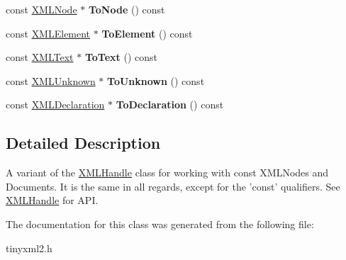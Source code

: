 \begin{DoxyCompactItemize}
\item 
\hypertarget{classtinyxml2_1_1_x_m_l_const_handle_a95d0256318c10c3f75fa5f8ffb3e4bc1}{const \hyperlink{classtinyxml2_1_1_x_m_l_node}{X\-M\-L\-Node} $\ast$ {\bfseries To\-Node} () const }\label{classtinyxml2_1_1_x_m_l_const_handle_a95d0256318c10c3f75fa5f8ffb3e4bc1}

\item 
\hypertarget{classtinyxml2_1_1_x_m_l_const_handle_a5a48adefc2a5e70d4ce5b55692a0e2f9}{const \hyperlink{classtinyxml2_1_1_x_m_l_element}{X\-M\-L\-Element} $\ast$ {\bfseries To\-Element} () const }\label{classtinyxml2_1_1_x_m_l_const_handle_a5a48adefc2a5e70d4ce5b55692a0e2f9}

\item 
\hypertarget{classtinyxml2_1_1_x_m_l_const_handle_ad86ca7dbb20d0495ae357fe7a866e0be}{const \hyperlink{classtinyxml2_1_1_x_m_l_text}{X\-M\-L\-Text} $\ast$ {\bfseries To\-Text} () const }\label{classtinyxml2_1_1_x_m_l_const_handle_ad86ca7dbb20d0495ae357fe7a866e0be}

\item 
\hypertarget{classtinyxml2_1_1_x_m_l_const_handle_acb358a329e54fa204ed2d0b181566828}{const \hyperlink{classtinyxml2_1_1_x_m_l_unknown}{X\-M\-L\-Unknown} $\ast$ {\bfseries To\-Unknown} () const }\label{classtinyxml2_1_1_x_m_l_const_handle_acb358a329e54fa204ed2d0b181566828}

\item 
\hypertarget{classtinyxml2_1_1_x_m_l_const_handle_a5de0c175845bc30a6f9b3d88d8877eaf}{const \hyperlink{classtinyxml2_1_1_x_m_l_declaration}{X\-M\-L\-Declaration} $\ast$ {\bfseries To\-Declaration} () const }\label{classtinyxml2_1_1_x_m_l_const_handle_a5de0c175845bc30a6f9b3d88d8877eaf}

\end{DoxyCompactItemize}


\subsection{Detailed Description}
A variant of the \hyperlink{classtinyxml2_1_1_x_m_l_handle}{X\-M\-L\-Handle} class for working with const X\-M\-L\-Nodes and Documents. It is the same in all regards, except for the 'const' qualifiers. See \hyperlink{classtinyxml2_1_1_x_m_l_handle}{X\-M\-L\-Handle} for A\-P\-I. 

The documentation for this class was generated from the following file\-:\begin{DoxyCompactItemize}
\item 
tinyxml2.\-h\end{DoxyCompactItemize}
